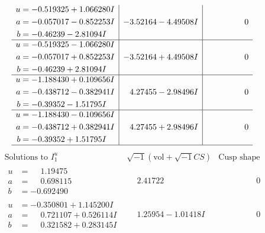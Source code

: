 \documentclass[1p]{elsarticle_modified}
\theoremstyle{definition}
\newcommand{\I}{\sqrt{-1}}
\begin{document}
$$\begin{array}{c|c|c}
\begin{aligned}
u &= -0.519325 + 1.066280 I \\
a &= -0.057017 - 0.852253 I \\
b &= -0.46239 - 2.81094 I\end{aligned}
 & -3.52164 - 4.49508 I & \phantom{-0.000000 } 0 \\ \hline\begin{aligned}
u &= -0.519325 - 1.066280 I \\
a &= -0.057017 + 0.852253 I \\
b &= -0.46239 + 2.81094 I\end{aligned}
 & -3.52164 + 4.49508 I & \phantom{-0.000000 } 0 \\ \hline\begin{aligned}
u &= -1.188430 + 0.109656 I \\
a &= -0.438712 - 0.382941 I \\
b &= -0.39352 - 1.51795 I\end{aligned}
 & \phantom{-}4.27455 - 2.98496 I & \phantom{-0.000000 } 0 \\ \hline\begin{aligned}
u &= -1.188430 - 0.109656 I \\
a &= -0.438712 + 0.382941 I \\
b &= -0.39352 + 1.51795 I\end{aligned}
 & \phantom{-}4.27455 + 2.98496 I & \phantom{-0.000000 } 0\\
 \hline 
 \end{array}$$\newpage$$\begin{array}{c|c|c}  
\text{Solutions to }I^u_{1}& \I (\text{vol} + \sqrt{-1}CS) & \text{Cusp shape}\\
 \hline 
\begin{aligned}
u &= \phantom{-}1.19475\phantom{ +0.000000I} \\
a &= \phantom{-}0.698115\phantom{ +0.000000I} \\
b &= -0.692490\phantom{ +0.000000I}\end{aligned}
 & \phantom{-}2.41722\phantom{ +0.000000I} & \phantom{-0.000000 } 0 \\ \hline\begin{aligned}
u &= -0.350801 + 1.145200 I \\
a &= \phantom{-}0.721107 + 0.526114 I \\
b &= \phantom{-}0.321582 + 0.283145 I\end{aligned}
 & \phantom{-}1.25954 - 1.01418 I & \phantom{-0.000000 } 0 \\ \hline\begin{aligned}

\end{aligned}
\end{array}$$
\end{document}
